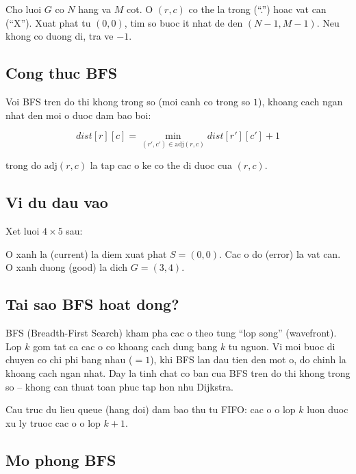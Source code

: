 Cho luoi $G$ co $N$ hang va $M$ cot. O $(r, c)$ co the la trong (``.'') hoac vat can (``X''). Xuat phat tu $(0, 0)$, tim so buoc it nhat de den $(N-1, M-1)$. Neu khong co duong di, tra ve $-1$.

\subsection{Cong thuc BFS}

Voi BFS tren do thi khong trong so (moi canh co trong so $1$), khoang cach ngan nhat den moi o duoc dam bao boi:

$$ dist[r][c] = \min_{(r',c') \in \text{adj}(r,c)} dist[r'][c'] + 1 $$

trong do $\text{adj}(r,c)$ la tap cac o ke co the di duoc cua $(r,c)$.

\subsection{Vi du dau vao}

Xet luoi $4 \times 5$ sau:

\begin{diagram}
\end{diagram}

O xanh la (current) la diem xuat phat $S = (0,0)$. Cac o do (error) la vat can. O xanh duong (good) la dich $G = (3,4)$.

\subsection{Tai sao BFS hoat dong?}

BFS (Breadth-First Search) kham pha cac o theo tung ``lop song'' (wavefront). Lop $k$ gom tat ca cac o co khoang cach dung bang $k$ tu nguon. Vi moi buoc di chuyen co chi phi bang nhau ($= 1$), khi BFS lan dau tien den mot o, do chinh la khoang cach ngan nhat. Day la tinh chat co ban cua BFS tren do thi khong trong so -- khong can thuat toan phuc tap hon nhu Dijkstra.

Cau truc du lieu queue (hang doi) dam bao thu tu FIFO: cac o o lop $k$ luon duoc xu ly truoc cac o o lop $k+1$.

\subsection{Mo phong BFS}

